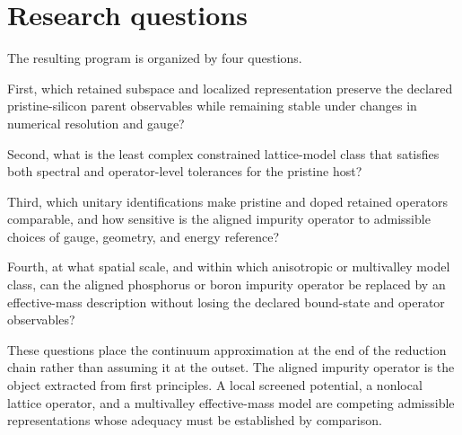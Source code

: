 \section*{Research questions}

The resulting program is organized by four questions.

First, which retained subspace and localized representation preserve the
declared pristine-silicon parent observables while remaining stable under
changes in numerical resolution and gauge?

Second, what is the least complex constrained lattice-model class that
satisfies both spectral and operator-level tolerances for the pristine host?

Third, which unitary identifications make pristine and doped retained operators
comparable, and how sensitive is the aligned impurity operator to admissible
choices of gauge, geometry, and energy reference?

Fourth, at what spatial scale, and within which anisotropic or multivalley model
class, can the aligned phosphorus or boron impurity operator be replaced by an
effective-mass description without losing the declared bound-state and operator
observables?

These questions place the continuum approximation at the end of the reduction
chain rather than assuming it at the outset. The aligned impurity operator is
the object extracted from first principles. A local screened potential, a
nonlocal lattice operator, and a multivalley effective-mass model are competing
admissible representations whose adequacy must be established by comparison.
